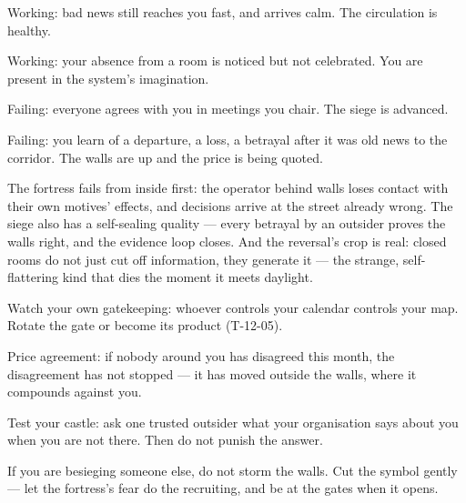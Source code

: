 \begin{feedback}
  \item Working: bad news still reaches you fast, and arrives calm. The circulation is healthy.
  \item Working: your absence from a room is noticed but not celebrated. You are present in the system's imagination.
  \item Failing: everyone agrees with you in meetings you chair. The siege is advanced.
  \item Failing: you learn of a departure, a loss, a betrayal after it was old news to the corridor. The walls are up and the price is being quoted.
\end{feedback}
\begin{failure}
The fortress fails from inside first: the operator behind walls loses contact with their own motives' effects, and decisions arrive at the street already wrong. The siege also has a self-sealing quality --- every betrayal by an outsider proves the walls right, and the evidence loop closes. And the reversal's crop is real: closed rooms do not just cut off information, they generate it --- the strange, self-flattering kind that dies the moment it meets daylight.
\end{failure}
\begin{countermeasures}
  \item Watch your own gatekeeping: whoever controls your calendar controls your map. Rotate the gate or become its product (T-12-05).
  \item Price agreement: if nobody around you has disagreed this month, the disagreement has not stopped --- it has moved outside the walls, where it compounds against you.
  \item Test your castle: ask one trusted outsider what your organisation says about you when you are not there. Then do not punish the answer.
  \item If you are besieging someone else, do not storm the walls. Cut the symbol gently --- let the fortress's fear do the recruiting, and be at the gates when it opens.
\end{countermeasures}

\seesources
{}
